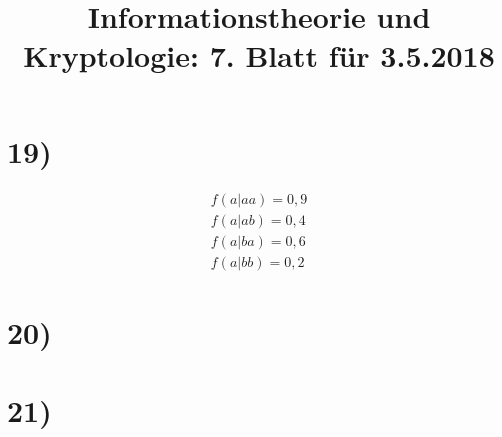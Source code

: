 %



  \title{Informationstheorie und Kryptologie: 7. Blatt für 3.5.2018}
  \maketitle

  \section*{19)}

  \begin{align*}
    f(a|aa) = 0,9\\
    f(a|ab) = 0,4\\
    f(a|ba) = 0,6\\
    f(a|bb) = 0,2
  \end{align*}

  \section*{20)}
  \section*{21)}

